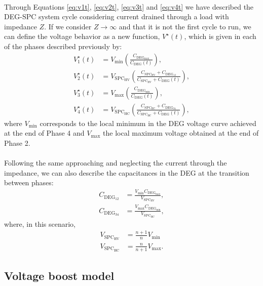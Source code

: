 \paragraph{} Through Equations \ref{eq:v1t}, \ref{eq:v2t}, \ref{eq:v3t} and \ref{eq:v4t} we have described the DEG-SPC system cycle considering current drained through a load with impedance $Z$. If we consider $Z\rightarrow\infty$ and that it is not the first cycle to run, we can define the voltage behavior as a new function, $V^\star(t)$, which is given in each of the phases described previously by:
\begin{align}
V_{1}^\star(t) &= V_\text{min}\left(\frac{C_{\text{DEG}_\text{max}}}{C_\text{DEG}(t)}\right), \label{V1star}\\
V_2^\star(t) &= V_{\text{SPC}_\text{HV}}\left(\frac{C_{\text{SPC}_\text{HV}}+C_{\text{DEG}_{12}}}{C_{\text{SPC}_\text{HV}}+C_\text{DEG}(t)}\right), \label{V2star}\\
V_{3}^\star(t) &= V_\text{max}\left(\frac{C_{\text{DEG}_\text{min}}}{C_\text{DEG}(t)}\right),\label{V3star}\\ 
V_4^\star(t) &= V_{\text{SPC}_\text{HC}}\left(\frac{C_{\text{SPC}_\text{HC}}+C_{\text{DEG}_{34}}}{C_{\text{SPC}_\text{HC}}+C_\text{DEG}(t)}\right), \label{V4star}
\end{align}
where $V_\text{min}$ corresponds to the local  minimum in the DEG voltage curve achieved at the end of Phase 4 and $V_\text{max}$ the local maximum voltage obtained at the end of Phase 2.

\paragraph{} Following the same approaching and neglecting the current through the impedance, we can also describe the capacitances in the DEG at the transition between phases:
\begin{align}
C_{\text{DEG}_{12}} &= \frac{V_\text{min}C_{\text{DEG}_\text{max}}}{V_{\text{SPC}_\text{HV}}},\\
C_{\text{DEG}_{34}} &= \frac{V_\text{max}C_{\text{DEG}_\text{min}}}{V_{\text{SPC}_\text{HC}}},
\end{align}
where, in this scenario,
\begin{align}
{V_{\text{SPC}_\text{HV}}} &=  \frac{n+1}{n}V_\text{min}\\
{V_{\text{SPC}_\text{HC}}} &=  \frac{n}{n+1}V_\text{max}.
\end{align}

\subsection{Voltage boost model}

